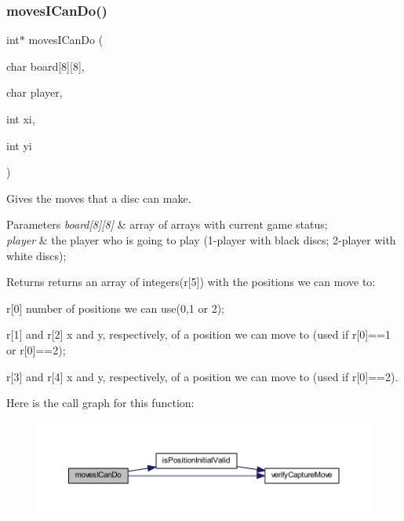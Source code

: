 \subsubsection{\texorpdfstring{moves\+I\+Can\+Do()}{movesICanDo()}}
{\footnotesize\ttfamily int$\ast$ moves\+I\+Can\+Do (\begin{DoxyParamCaption}\item[{char}]{board\mbox{[}8\mbox{]}\mbox{[}8\mbox{]},  }\item[{char}]{player,  }\item[{int}]{xi,  }\item[{int}]{yi }\end{DoxyParamCaption})}



Gives the moves that a disc can make. 


\begin{DoxyParams}{Parameters}
{\em board\mbox{[}8\mbox{]}\mbox{[}8\mbox{]}} & array of arrays with current game status; \\
\hline
{\em player} & the player who is going to play (1-\/player with black discs; 2-\/player with white discs); \\
\hline
\end{DoxyParams}
\begin{DoxyReturn}{Returns}
returns an array of integers(r\mbox{[}5\mbox{]}) with the positions we can move to\+: 

r\mbox{[}0\mbox{]} number of positions we can use(0,1 or 2); 

r\mbox{[}1\mbox{]} and r\mbox{[}2\mbox{]} x and y, respectively, of a position we can move to (used if r\mbox{[}0\mbox{]}==1 or r\mbox{[}0\mbox{]}==2); 

r\mbox{[}3\mbox{]} and r\mbox{[}4\mbox{]} x and y, respectively, of a position we can move to (used if r\mbox{[}0\mbox{]}==2). 
\end{DoxyReturn}
Here is the call graph for this function\+:\nopagebreak
\begin{figure}[H]
\begin{center}
\leavevmode
\includegraphics[width=350pt]{group___program_logic_ga8d87858478876b33304e38cea751951b_cgraph}
\end{center}
\end{figure}
\hypertarget{group___program_logic_ga484dd8982591f724c6ff6749bba6869a}{}\label{group___program_logic_ga484dd8982591f724c6ff6749bba6869a} 
